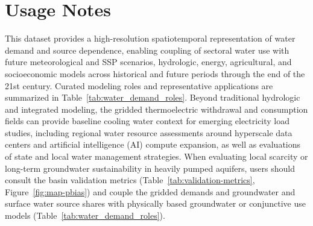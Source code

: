 \documentclass[fleqn,10pt]{wlscirep}
\begin{document}
\section*{Usage Notes}

This dataset provides a high-resolution spatiotemporal representation of water demand and source dependence, enabling coupling of sectoral water use with future meteorological and SSP scenarios, hydrologic, energy, agricultural, and socioeconomic models across historical and future periods through the end of the 21st century. Curated modeling roles and representative applications are summarized in Table~\ref{tab:water_demand_roles}. Beyond traditional hydrologic and integrated modeling, the gridded thermoelectric withdrawal and consumption fields can provide baseline cooling water context for emerging electricity load studies, including regional water resource assessments around hyperscale data centers and artificial intelligence (AI) compute expansion, as well as evaluations of state and local water management strategies. When evaluating local scarcity or long-term groundwater sustainability in heavily pumped aquifers, users should consult the basin validation metrics (Table~\ref{tab:validation-metrics}, Figure~\ref{fig:map-pbias}) and couple the gridded demands and groundwater and surface water source shares with physically based groundwater or conjunctive use models (Table~\ref{tab:water_demand_roles}).
\end{document}
